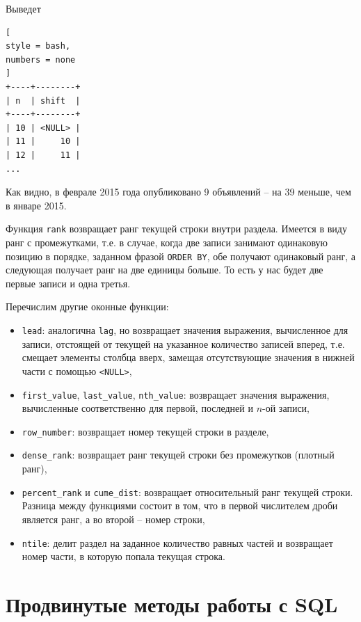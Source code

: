 \documentclass[%
	11pt,
	a4paper,
	utf8,
		]{article}
\begin{document}
Выведет
\begin{lstlisting}[
style = bash,
numbers = none
]
+----+--------+
| n  | shift  |
+----+--------+
| 10 | <NULL> |
| 11 |     10 |
| 12 |     11 |
...
\end{lstlisting}

Как видно, в феврале 2015 года опубликовано 9 объявлений -- на 39 меньше, чем в январе 2015.

Функция \texttt{rank} возвращает ранг текущей строки внутри раздела. Имеется в виду ранг с промежутками, т.е. в случае, когда две записи занимают одинаковую позицию в порядке, заданном фразой \texttt{ORDER BY}, обе получают одинаковый ранг, а следующая получает ранг на две единицы больше. То есть у нас будет две первые записи и одна третья.

Перечислим другие оконные функции:
\begin{itemize}
	\item \texttt{lead}: аналогична \texttt{lag}, но возвращает значения выражения, вычисленное для записи, отстоящей от текущей на указанное количество записей вперед, т.е. смещает элементы столбца вверх, замещая отсутствующие значения в нижней части с помощью \texttt{<NULL>},
	
	\item \texttt{first\_value}, \texttt{last\_value}, \texttt{nth\_value}: возвращает значения выражения, вычисленные соответственно для первой, последней и $ n $-ой записи,
	
	\item \texttt{row\_number}: возвращает номер текущей строки в разделе,
	
	\item \texttt{dense\_rank}: возвращает ранг текущей строки без промежутков (плотный ранг),
	
	\item \texttt{percent\_rank} и \texttt{cume\_dist}: возвращает относительный ранг текущей строки. Разница между функциями состоит в том, что в первой числителем дроби является ранг, а во второй -- номер строки,
	
	\item \texttt{ntile}: делит раздел на заданное количество равных частей и возвращает номер части, в которую попала текущая строка.
\end{itemize}

\section{Продвинутые методы работы с SQL}
\end{document}
